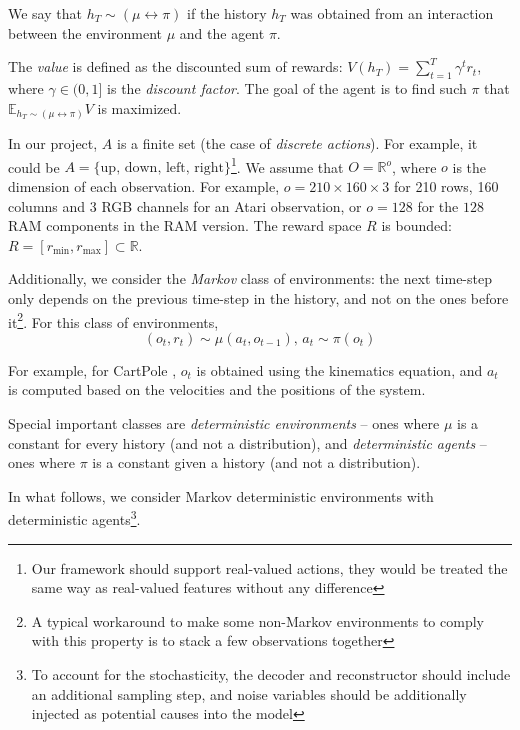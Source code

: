 \documentclass[a4paper,11pt,oneside]{report}
\begin{document}
We say that $h_T\sim (\mu\leftrightarrow\pi)$ if the history $h_T$ was obtained from an interaction between the environment $\mu$ and the agent $\pi$.

The {\em value} is defined as the discounted sum of rewards: $V(h_T)=\sum\limits_{t=1}^T\gamma^t r_t$, where $\gamma\in(0, 1]$ is the {\em discount factor}. The goal of the agent is to find such $\pi$ that $\mathbb E_{h_T\sim (\mu\leftrightarrow \pi)} V$ is maximized.

In our project, $A$ is a finite set (the case of {\em discrete actions}). For example, it could be $A=\{\mbox{up},\,\mbox{down},\,\mbox{left},\,\mbox{right}\}$\footnote{Our framework should support real-valued actions, they would be treated the same way as real-valued features without any difference}. We assume that $O=\mathbb R^o$, where $o$ is the dimension of each observation. For example, $o=210\times 160\times 3$ for 210 rows, 160 columns and 3 RGB channels for an Atari \cite{brockman2016openai} observation, or $o=128$ for the $128$ RAM components in the RAM version. The reward space $R$ is bounded: $R=[r_{\min}, r_{\max}]\subset \mathbb R$.

Additionally, we consider the {\em Markov} class of environments: the next time-step only depends on the previous time-step in the history, and not on the ones before it\footnote{A typical workaround to make some non-Markov environments to comply with this property is to stack a few observations together}. For this class of environments,
$$
(o_t, r_t)\sim \mu(a_t, o_{t-1}),\,a_t\sim\pi(o_t)
$$

For example, for CartPole \cite{brockman2016openai}, $o_t$ is obtained using the kinematics equation, and $a_t$ is computed based on the velocities and the positions of the system.

Special important classes are {\em deterministic environments} -- ones where $\mu$ is a constant for every history (and not a distribution), and {\em deterministic agents} -- ones where $\pi$ is a constant given a history (and not a distribution).

In what follows, we consider Markov deterministic environments with deterministic agents\footnote{To account for the stochasticity, the decoder and reconstructor should include an additional sampling step, and noise variables should be additionally injected as potential causes into the model}.
\end{document}
